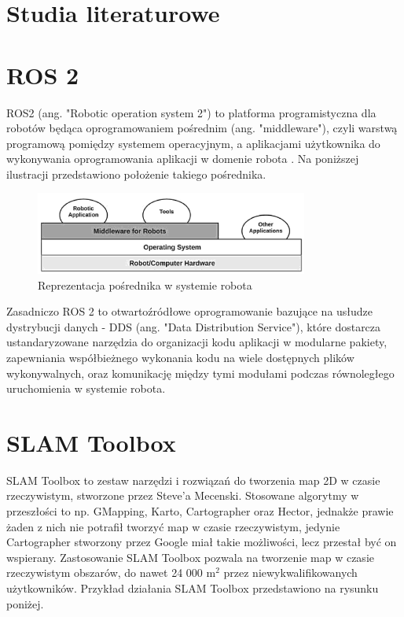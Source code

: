 \documentclass[a4paper,twoside,12pt]{book}
\begin{document}
\section{Studia literaturowe}
\section{ROS 2}
ROS2 (ang. "Robotic operation system 2") to platforma programistyczna dla robotów będąca oprogramowaniem pośrednim (ang. "middleware"), czyli warstwą programową pomiędzy systemem operacyjnym, a aplikacjami użytkownika do wykonywania oprogramowania aplikacji w domenie robota \cite{bib:ros2Concise}. Na poniższej ilustracji przedstawiono położenie takiego pośrednika.
\begin{figure}[h]
	\centering
	\includegraphics[width=0.8\textwidth]{images/middle.png}
	\caption{Reprezentacja pośrednika w systemie robota}
	\label{fig:middle}
	\end{figure}
\newline
Zasadniczo ROS 2 to otwartoźródłowe oprogramowanie bazujące na usłudze dystrybucji danych - DDS (ang. "Data Distribution Service"), które dostarcza ustandaryzowane narzędzia do organizacji kodu aplikacji w modularne pakiety, zapewniania współbieżnego wykonania kodu na wiele dostępnych plików wykonywalnych, oraz komunikację między tymi modułami podczas równoległego uruchomienia w systemie robota.\cite{bib:guide}

\newpage
\section{SLAM Toolbox}
SLAM Toolbox to zestaw narzędzi i rozwiązań do tworzenia map 2D w czasie rzeczywistym, stworzone przez Steve'a Mecenski.
 Stosowane algorytmy w przeszłości to np. GMapping, Karto, Cartographer oraz Hector, jednakże prawie żaden z nich nie potrafił tworzyć map w czasie rzeczywistym, jedynie Cartographer stworzony przez Google miał takie możliwości, lecz przestał być on wspierany.
 \cite{bib:slamtoolbox} Zastosowanie SLAM Toolbox pozwala na tworzenie map w czasie rzeczywistym obszarów, do nawet 24 000 m$^2$ przez niewykwalifikowanych użytkowników. Przykład działania SLAM Toolbox przedstawiono na rysunku poniżej.
\end{document}

